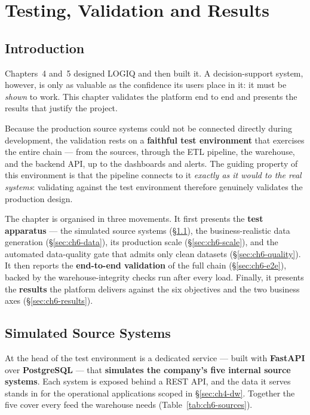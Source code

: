 \chapter{Testing, Validation and Results}

\section*{Introduction}

Chapters~4 and~5 designed LOGIQ and then built it. A decision-support system, however, is only as
valuable as the confidence its users place in it: it must be \emph{shown} to work. This chapter
validates the platform end to end and presents the results that justify the project.

Because the production source systems could not be connected directly during development, the validation
rests on a \textbf{faithful test environment} that exercises the entire chain --- from the sources,
through the ETL pipeline, the warehouse, and the backend API, up to the dashboards and alerts. The
guiding property of this environment is that the pipeline connects to it \emph{exactly as it would to
the real systems}: validating against the test environment therefore genuinely validates the production
design.

The chapter is organised in three movements. It first presents the \textbf{test apparatus} --- the
simulated source systems (\S\ref{sec:ch6-sources}), the business-realistic data generation
(\S\ref{sec:ch6-data}), its production scale (\S\ref{sec:ch6-scale}), and the automated data-quality
gate that admits only clean datasets (\S\ref{sec:ch6-quality}). It then reports the \textbf{end-to-end
validation} of the full chain (\S\ref{sec:ch6-e2e}), backed by the warehouse-integrity checks run after
every load. Finally, it presents the \textbf{results} the platform delivers against the six objectives
and the two business axes (\S\ref{sec:ch6-results}).

\section{Simulated Source Systems}
\label{sec:ch6-sources}

At the head of the test environment is a dedicated service --- built with \textbf{FastAPI} over
\textbf{PostgreSQL} --- that \textbf{simulates the company's five internal source systems}. Each system
is exposed behind a REST API, and the data it serves stands in for the operational applications scoped in
\S\ref{sec:ch4-dw}. Together the five cover every feed the warehouse needs (Table~\ref{tab:ch6-sources}).

